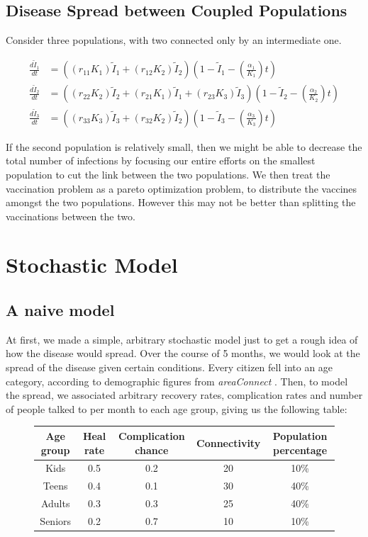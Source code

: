 \documentclass{article}
\begin{document}
\subsection{Disease Spread between Coupled Populations}

Consider three populations, with two connected only by an intermediate
	one.


\begin{align*}
\frac{d\widetilde{I}_1}{dt} & = \left( \left( r_{11} K_1 \right) \widetilde{I}_1 
			+ \left( r_{12} K_2 \right)  \widetilde{I}_2 \right)
		\left( 1 - \widetilde{I}_1 - \left( \frac{\alpha_1}{K_1} \right) t \right)\\
\frac{d\widetilde{I}_2}{dt} & = \left( \left( r_{22} K_2 \right) \widetilde{I}_2 
			+ \left( r_{21} K_1 \right)  \widetilde{I}_1 
			+ \left( r_{23} K_3 \right) \widetilde{I}_3 \right)
		\left( 1 - \widetilde{I}_2 - \left( \frac{\alpha_2}{K_2} \right) t \right)\\
\frac{d\widetilde{I}_3}{dt} & = \left( \left( r_{33} K_3 \right) \widetilde{I}_3 
			+ \left( r_{32} K_2 \right)  \widetilde{I}_2 \right)
		\left( 1 - \widetilde{I}_3 - \left( \frac{\alpha_3}{K_3} \right) t \right)
\end{align*}

If the second population is relatively small, then we might be able to 
	decrease the total number of infections by focusing our entire efforts
	on the smallest population to cut the link between the two populations.
We then treat the vaccination problem as a pareto optimization problem, to distribute
	the vaccines amongst the two populations.
However this may not be better than splitting the vaccinations between the two.

\section{Stochastic Model}
\subsection{A naive model}
\par At first, we made a simple, arbitrary stochastic model just to get a rough idea of how the disease would spread. Over the course of 5 months, we would look at the spread of the disease given certain conditions. Every citizen fell into an age category, according to demographic figures from \emph{areaConnect} \cite{areconnect}. Then, to model the spread, we associated arbitrary recovery rates, complication rates and number of people talked to per month to each age group, giving us the following table:
\begin{figure}[H]
\centering
\begin{tabular}{c|c|c|c|c}
Age group & Heal rate & Complication chance & Connectivity & Population percentage\\ \hline
Kids & 0.5 & 0.2 & 20 & 10\%\\
Teens & 0.4 & 0.1 & 30 & 40\%\\
Adults & 0.3 & 0.3 & 25 & 40\%\\
Seniors & 0.2 & 0.7 & 10 & 10\%
\end{tabular}
\end{figure}
\end{document}
